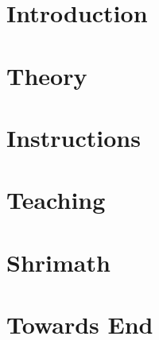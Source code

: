 \section[Intro]{Introduction}


\section[Theory]{Theory}


\section[Instructs]{Instructions}


\section[Teaching]{Teaching}


\section[Shrimath]{Shrimath}


\section[End]{Towards End}
